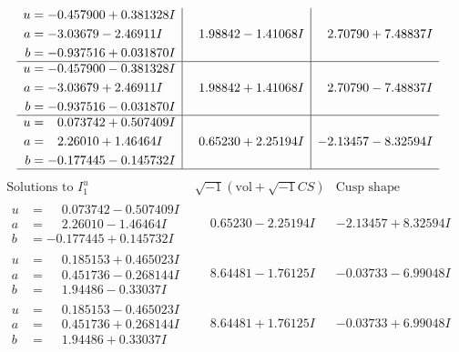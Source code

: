 \documentclass[1p]{elsarticle_modified}
\theoremstyle{definition}
\newcommand{\I}{\sqrt{-1}}
\begin{document}
$$\begin{array}{c|c|c}
\begin{aligned}
u &= -0.457900 + 0.381328 I \\
a &= -3.03679 - 2.46911 I \\
b &= -0.937516 + 0.031870 I\end{aligned}
 & \phantom{-}1.98842 - 1.41068 I & \phantom{-}2.70790 + 7.48837 I \\ \hline\begin{aligned}
u &= -0.457900 - 0.381328 I \\
a &= -3.03679 + 2.46911 I \\
b &= -0.937516 - 0.031870 I\end{aligned}
 & \phantom{-}1.98842 + 1.41068 I & \phantom{-}2.70790 - 7.48837 I \\ \hline\begin{aligned}
u &= \phantom{-}0.073742 + 0.507409 I \\
a &= \phantom{-}2.26010 + 1.46464 I \\
b &= -0.177445 - 0.145732 I\end{aligned}
 & \phantom{-}0.65230 + 2.25194 I & -2.13457 - 8.32594 I\\
 \hline 
 \end{array}$$\newpage$$\begin{array}{c|c|c}  
\text{Solutions to }I^u_{1}& \I (\text{vol} + \sqrt{-1}CS) & \text{Cusp shape}\\
 \hline 
\begin{aligned}
u &= \phantom{-}0.073742 - 0.507409 I \\
a &= \phantom{-}2.26010 - 1.46464 I \\
b &= -0.177445 + 0.145732 I\end{aligned}
 & \phantom{-}0.65230 - 2.25194 I & -2.13457 + 8.32594 I \\ \hline\begin{aligned}
u &= \phantom{-}0.185153 + 0.465023 I \\
a &= \phantom{-}0.451736 - 0.268144 I \\
b &= \phantom{-}1.94486 - 0.33037 I\end{aligned}
 & \phantom{-}8.64481 - 1.76125 I & -0.03733 - 6.99048 I \\ \hline\begin{aligned}
u &= \phantom{-}0.185153 - 0.465023 I \\
a &= \phantom{-}0.451736 + 0.268144 I \\
b &= \phantom{-}1.94486 + 0.33037 I\end{aligned}
 & \phantom{-}8.64481 + 1.76125 I & -0.03733 + 6.99048 I \\ \hline\begin{aligned}

\end{aligned}
\end{array}$$
\end{document}
